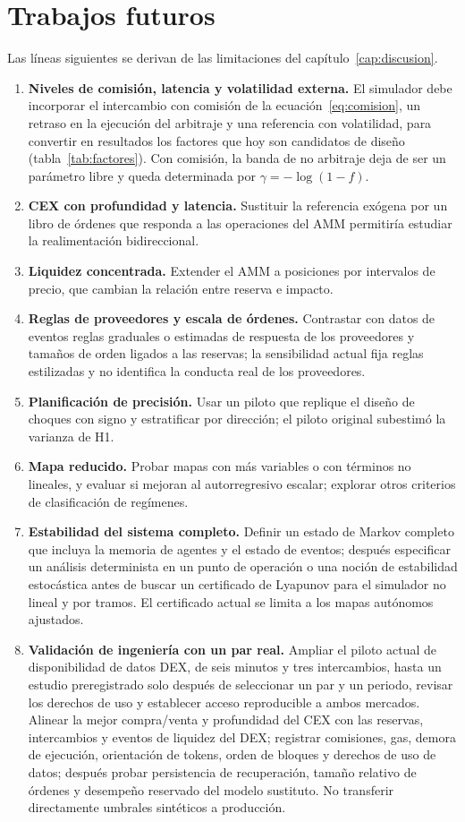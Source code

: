 \chapter{Trabajos futuros}
\label{cap:futuro}

Las líneas siguientes se derivan de las limitaciones del capítulo~\ref{cap:discusion}.

\begin{enumerate}
  \item \textbf{Niveles de comisión, latencia y volatilidad externa.} El simulador debe incorporar el intercambio con comisión de la ecuación~\eqref{eq:comision}, un retraso en la ejecución del arbitraje y una referencia con volatilidad, para convertir en resultados los factores que hoy son candidatos de diseño (tabla~\ref{tab:factores}). Con comisión, la banda de no arbitraje deja de ser un parámetro libre y queda determinada por $\gamma=-\log(1-f)$.
  \item \textbf{CEX con profundidad y latencia.} Sustituir la referencia exógena por un libro de órdenes que responda a las operaciones del AMM permitiría estudiar la realimentación bidireccional.
  \item \textbf{Liquidez concentrada.} Extender el AMM a posiciones por intervalos de precio, que cambian la relación entre reserva e impacto.
  \item \textbf{Reglas de proveedores y escala de órdenes.} Contrastar con datos de eventos reglas graduales o estimadas de respuesta de los proveedores y tamaños de orden ligados a las reservas; la sensibilidad actual fija reglas estilizadas y no identifica la conducta real de los proveedores.
  \item \textbf{Planificación de precisión.} Usar un piloto que replique el diseño de choques con signo y estratificar por dirección; el piloto original subestimó la varianza de H1.
  \item \textbf{Mapa reducido.} Probar mapas con más variables o con términos no lineales, y evaluar si mejoran al autorregresivo escalar; explorar otros criterios de clasificación de regímenes.
  \item \textbf{Estabilidad del sistema completo.} Definir un estado de Markov completo que incluya la memoria de agentes y el estado de eventos; después especificar un análisis determinista en un punto de operación o una noción de estabilidad estocástica antes de buscar un certificado de Lyapunov para el simulador no lineal y por tramos. El certificado actual se limita a los mapas autónomos ajustados.
  \item \textbf{Validación de ingeniería con un par real.} Ampliar el piloto actual de disponibilidad de datos DEX, de seis minutos y tres intercambios, hasta un estudio preregistrado solo después de seleccionar un par y un periodo, revisar los derechos de uso y establecer acceso reproducible a ambos mercados. Alinear la mejor compra/venta y profundidad del CEX con las reservas, intercambios y eventos de liquidez del DEX; registrar comisiones, gas, demora de ejecución, orientación de tokens, orden de bloques y derechos de uso de datos; después probar persistencia de recuperación, tamaño relativo de órdenes y desempeño reservado del modelo sustituto. No transferir directamente umbrales sintéticos a producción.

\end{enumerate}
